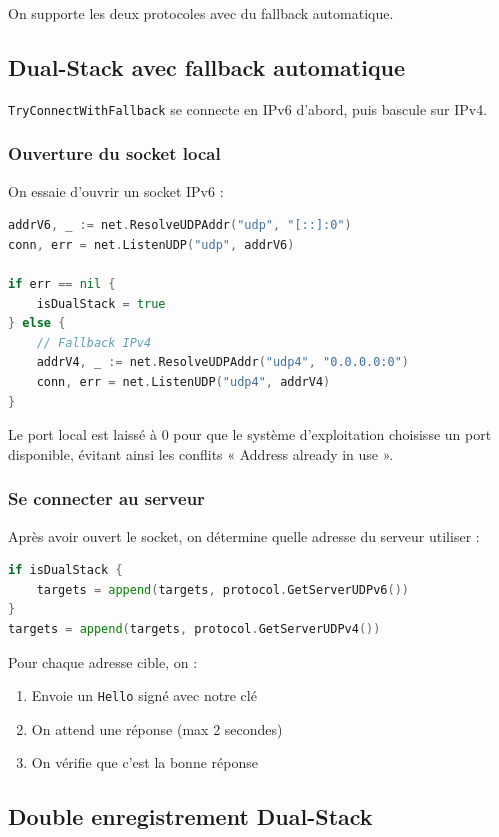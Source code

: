 \documentclass[11pt,a4paper]{report}
\begin{document}
On supporte les deux protocoles avec du fallback automatique.

\subsection{Dual-Stack avec fallback automatique}

\texttt{TryConnectWithFallback} se connecte en IPv6 d'abord, puis bascule sur IPv4.

\subsubsection{Ouverture du socket local}

On essaie d'ouvrir un socket IPv6 :

\begin{lstlisting}[language=Go]
addrV6, _ := net.ResolveUDPAddr("udp", "[::]:0")
conn, err = net.ListenUDP("udp", addrV6)

if err == nil {
    isDualStack = true
} else {
    // Fallback IPv4
    addrV4, _ := net.ResolveUDPAddr("udp4", "0.0.0.0:0")
    conn, err = net.ListenUDP("udp4", addrV4)
}
\end{lstlisting}

Le port local est laissé à 0 pour que le système d'exploitation choisisse un port disponible, évitant ainsi les conflits « Address already in use ».

\subsubsection{Se connecter au serveur}

Après avoir ouvert le socket, on détermine quelle adresse du serveur utiliser :

\begin{lstlisting}[language=Go]
if isDualStack {
    targets = append(targets, protocol.GetServerUDPv6())
}
targets = append(targets, protocol.GetServerUDPv4())
\end{lstlisting}

Pour chaque adresse cible, on :
\begin{enumerate}
    \item Envoie un \texttt{Hello} signé avec notre clé
    \item On attend une réponse (max 2 secondes)
    \item On vérifie que c'est la bonne réponse
\end{enumerate}

\subsection{Double enregistrement Dual-Stack}
\end{document}
